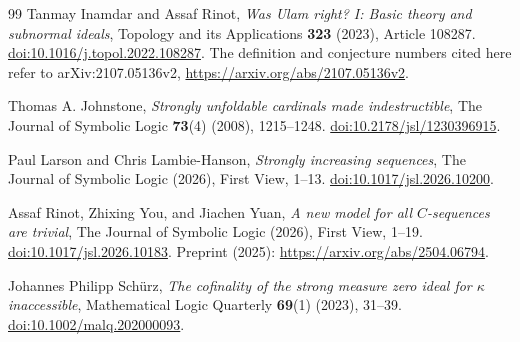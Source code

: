 \documentclass[10pt,a4paper]{amsart}
\theoremstyle{definition}
\theoremstyle{remark}
\begin{document}
\begin{thebibliography}{99}
Tanmay Inamdar and Assaf Rinot,
\emph{Was Ulam right? I: Basic theory and subnormal ideals},
Topology and its Applications \textbf{323} (2023), Article 108287.
\href{https://doi.org/10.1016/j.topol.2022.108287}
     {doi:10.1016/j.topol.2022.108287}.
The definition and conjecture numbers cited here refer to
arXiv:2107.05136v2,
\url{https://arxiv.org/abs/2107.05136v2}.

Thomas A. Johnstone,
\emph{Strongly unfoldable cardinals made indestructible},
The Journal of Symbolic Logic \textbf{73}(4) (2008), 1215--1248.
\href{https://doi.org/10.2178/jsl/1230396915}
     {doi:10.2178/jsl/1230396915}.

Paul Larson and Chris Lambie-Hanson,
\emph{Strongly increasing sequences},
The Journal of Symbolic Logic (2026), First View, 1--13.
\href{https://doi.org/10.1017/jsl.2026.10200}
     {doi:10.1017/jsl.2026.10200}.

Assaf Rinot, Zhixing You, and Jiachen Yuan,
\emph{A new model for all \(C\)-sequences are trivial},
The Journal of Symbolic Logic (2026), First View, 1--19.
\href{https://doi.org/10.1017/jsl.2026.10183}
     {doi:10.1017/jsl.2026.10183}.
Preprint (2025): \url{https://arxiv.org/abs/2504.06794}.

Johannes Philipp Sch\"urz,
\emph{The cofinality of the strong measure zero ideal for
                   \(\kappa\) inaccessible},
Mathematical Logic Quarterly \textbf{69}(1) (2023), 31--39.
\href{https://doi.org/10.1002/malq.202000093}
     {doi:10.1002/malq.202000093}.

\end{thebibliography}
\end{document}
